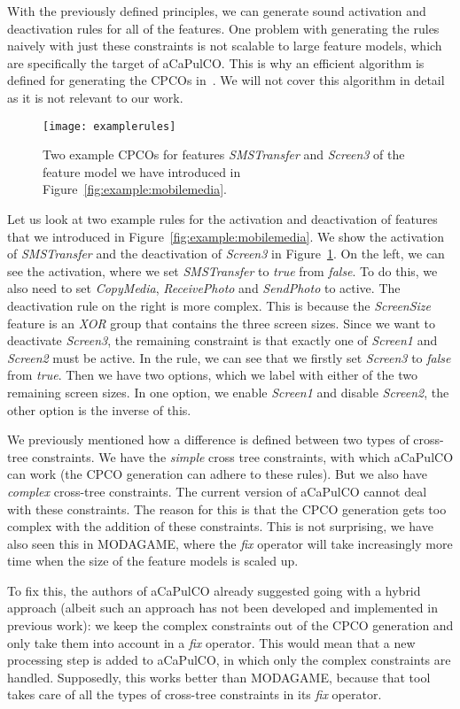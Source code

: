 With the previously defined principles, we can generate sound activation and
deactivation rules for all of the features. One problem with generating the 
rules naively with just these constraints is not scalable to large feature models,
which are specifically the target of aCaPulCO. This is why an efficient algorithm
is defined for generating the CPCOs in~\cite{horcas2022breakit}. We will not cover
this algorithm in detail as it is not relevant to our work.

\begin{figure}
    \texttt{[image: examplerules]}
    \caption{Two example CPCOs for features \emph{SMSTransfer} and \emph{Screen3} of the feature model we have introduced in Figure~\ref{fig:example:mobilemedia}.}
    \label{fig:example:cpcos}
\end{figure}

Let us look at two example rules for the activation and deactivation of features
that we introduced in Figure~\ref{fig:example:mobilemedia}. We show the activation
of \emph{SMSTransfer} and the deactivation of \emph{Screen3} in 
Figure~\ref{fig:example:cpcos}. On the left, we can see the activation, where we set
\emph{SMSTransfer} to \emph{true} from \emph{false}. To do this, we also need to set
\emph{CopyMedia}, \emph{ReceivePhoto} and \emph{SendPhoto} to active. The deactivation
rule on the right is more complex. This is because the \emph{ScreenSize} feature is an
\emph{XOR} group that contains the three screen sizes. Since we want to deactivate
\emph{Screen3}, the remaining constraint is that exactly one of \emph{Screen1} and
\emph{Screen2} must be active. In the rule, we can see that we firstly set
\emph{Screen3} to \emph{false} from \emph{true}. Then we have two options, which we
label with either of the two remaining screen sizes. In one option, we enable
\emph{Screen1} and disable \emph{Screen2}, the other option is the inverse of this.

We previously mentioned how a difference is defined between two types of cross-tree constraints. We have the \emph{simple} cross tree constraints, with which
aCaPulCO can work (the CPCO generation can adhere to these rules). But we also
have \emph{complex} cross-tree constraints. The current version of aCaPulCO
cannot deal with these constraints. The reason for this is that the CPCO
generation gets too complex with the addition of these constraints. This is not
surprising, we have also seen this in MODAGAME, where the \emph{fix} operator 
will take increasingly more time when the size of the feature models is scaled
up.

To fix this, the authors of aCaPulCO already suggested going with a hybrid
approach (albeit such an approach has not been developed and implemented in
previous work): we keep the complex constraints out of the CPCO generation and only
take them into account in a \emph{fix} operator. This would mean that a new
processing step is added to aCaPulCO, in which only the complex constraints are
handled. Supposedly, this works better than MODAGAME, because that tool takes
care of all the types of cross-tree constraints in its \emph{fix} operator.

